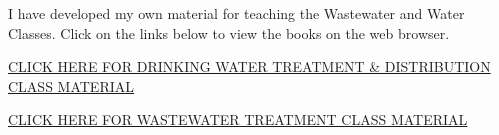 \documentclass{article}
\begin{document}
I have developed my own material for teaching the Wastewater and Water Classes.  Click on the links below to view the books on the web browser.

\begin{tcolorbox}[width=17cm,box align=center, halign=center,  valign=center,colback={my-blue},title={}, colbacktitle=yellow,coltitle=blue]    
\href{https://sbasrai.github.io/WaterTreatmentandDistribution/WaterTreatmentandDistribution.html}{CLICK HERE FOR DRINKING WATER TREATMENT \& DISTRIBUTION CLASS MATERIAL}
\end{tcolorbox} 

\begin{tcolorbox}[width=17cm,box align=center, halign=center,  valign=center,colback={my-blue},title={}, colbacktitle=yellow,coltitle=blue]    
\href{https://sbasrai.github.io/BassettWWTreatment/BassettWWTreatment.html}{CLICK HERE FOR WASTEWATER TREATMENT CLASS MATERIAL}
\end{tcolorbox} 
\end{document}
